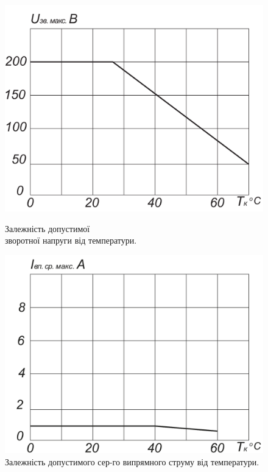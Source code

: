 \documentclass[a4paper,14pt]{extreport}
\begin{document}
\begin{figure}[h!]\label{im3}
	\begin{minipage}[h]{0.5\linewidth}
		\includegraphics[width=1\linewidth]{1.20.pdf}
    \caption{Залежність допустимої \\зворотної напруги від температури.}
  \end{minipage}
\hfill
  \begin{minipage}[h]{0.5\linewidth}
		\includegraphics[width=1\linewidth]{1.21.pdf}
    \caption{Залежність допустимого сер-го випрямного струму від температури.}
	\end{minipage}
\end{figure}
\end{document}
